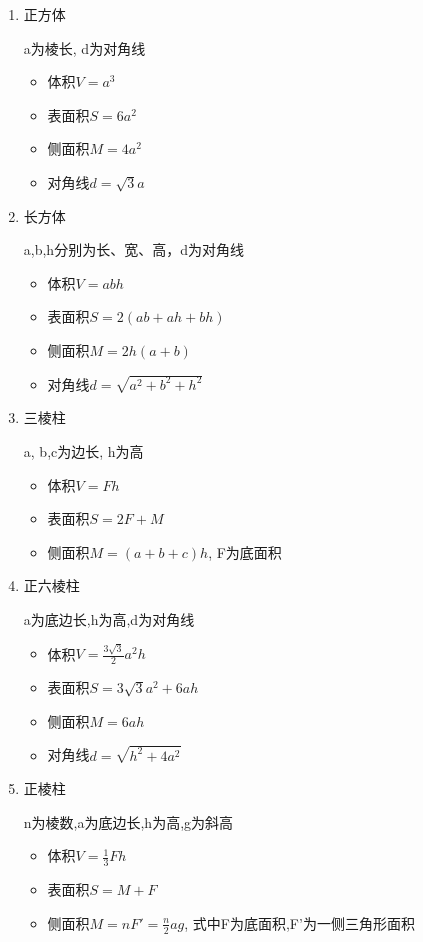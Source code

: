 \begin{enumerate}
	\item 正方体
	
	a为棱长, d为对角线
	\begin{itemize}
		\item 体积$V = a^3$
		\item 表面积$S = 6a^2$
		\item 侧面积$M = 4a^2$
		\item 对角线$d = \sqrt{3} a$
	\end{itemize}
	
	\item 长方体
	
	a,b,h分别为长、宽、高，d为对角线
	\begin{itemize}
		\item 体积$V = abh$
		\item 表面积$S = 2(ab + ah + bh)$
		\item 侧面积$M = 2h(a+b)$
		\item 对角线$d = \sqrt{a^2 + b^2 + h^2}$
	\end{itemize}
	
	\item 三棱柱
	
	a, b,c为边长, h为高
	\begin{itemize}
		\item 体积$V = Fh$
		\item 表面积$S = 2F + M$
		\item 侧面积$M = (a + b + c)h$, F为底面积
	\end{itemize}
	
	\item 正六棱柱
	
	a为底边长,h为高,d为对角线
	\begin{itemize}
		\item 体积$\displaystyle V = \frac{3 \sqrt{3}}{2} a^2 h$
		\item 表面积$S = 3\sqrt{3} a^2 + 6ah$
		\item 侧面积$M = 6ah$
		\item 对角线$d = \sqrt{h^2 + 4 a^2}$
	\end{itemize}
	
	\item 正棱柱
	
	n为棱数,a为底边长,h为高,g为斜高
	\begin{itemize}
		\item 体积$\displaystyle V = \frac{1}{3} Fh$
		\item 表面积$S = M + F$
		\item 侧面积$M = nF' = \frac{n}{2}ag$, 式中F为底面积,F'为一侧三角形面积
	\end{itemize}
	

\end{enumerate}
